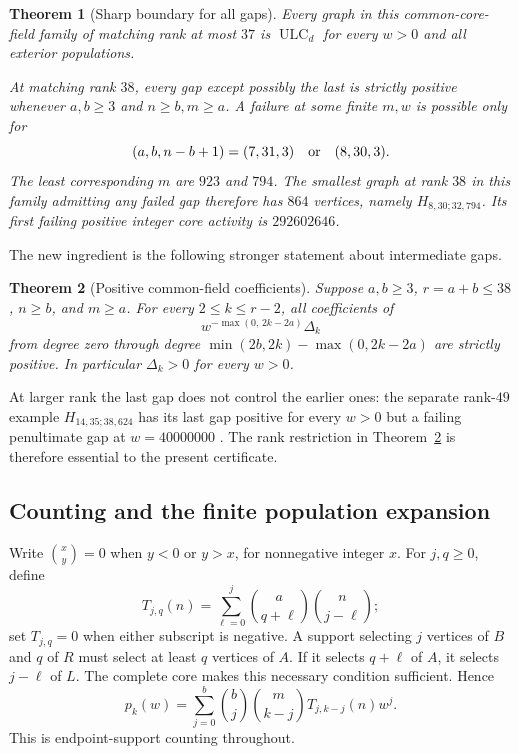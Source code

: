 \documentclass[11pt,a4paper]{article}
\newtheorem{theorem}{Theorem}[section]
\theoremstyle{remark}\newtheorem{remark}[theorem]{Remark}
\newcommand{\ULC}{\operatorname{ULC}}      %
\begin{document}
\begin{theorem}[Sharp boundary for all gaps]\label{mrn:u:ag:thm:main}
Every graph in this common-core-field family of matching rank at most $37$ is $\ULC_d$ for every $w>0$ and all exterior populations.

At matching rank $38$, every gap except possibly the last is strictly positive whenever $a,b\ge3$ and $n\ge b,m\ge a$. A failure at some finite $m,w$ is possible only for
\[
 (a,b,n-b+1)=(7,31,3)\quad\hbox{or}\quad(8,30,3).
\]
The least corresponding $m$ are $923$ and $794$. The smallest graph at rank $38$ in this family admitting any failed gap therefore has $864$ vertices, namely $H_{8,30;32,794}$. Its first failing positive integer core activity is $292602646$.
\end{theorem}

The new ingredient is the following stronger statement about intermediate gaps.
\begin{theorem}[Positive common-field coefficients]\label{mrn:u:ag:thm:intermediate}
Suppose $a,b\ge3$, $r=a+b\le38$, $n\ge b$, and $m\ge a$. For every $2\le k\le r-2$, all coefficients of
\[
 w^{-\max(0,\,2k-2a)}\Delta_k
\]
from degree zero through degree $\min(2b,2k)-\max(0,2k-2a)$ are strictly positive. In particular $\Delta_k>0$ for every $w>0$.
\end{theorem}

At larger rank the last gap does not control the earlier ones: the separate rank-$49$ example $H_{14,35;38,624}$ has its last gap positive for every $w>0$ but a failing penultimate gap at $w=40000000$ \cite{b:m51}. The rank restriction in Theorem~\ref{mrn:u:ag:thm:intermediate} is therefore essential to the present certificate.

\subsection{Counting and the finite population expansion}
Write $\binom xy=0$ when $y<0$ or $y>x$, for nonnegative integer $x$. For $j,q\ge0$, define
\begin{equation}\label{mrn:u:ag:eq:T}
 T_{j,q}(n)=\sum_{\ell=0}^{j}\binom a{q+\ell}\binom n{j-\ell};
\end{equation}
set $T_{j,q}=0$ when either subscript is negative. A support selecting $j$ vertices of $B$ and $q$ of $R$ must select at least $q$ vertices of $A$. If it selects $q+\ell$ of $A$, it selects $j-\ell$ of $L$. The complete core makes this necessary condition sufficient. Hence
\begin{equation}\label{mrn:u:ag:eq:pk}
 p_k(w)=\sum_{j=0}^{b}\binom bj\binom m{k-j}T_{j,k-j}(n)w^j.
\end{equation}
This is endpoint-support counting throughout.
\end{document}
